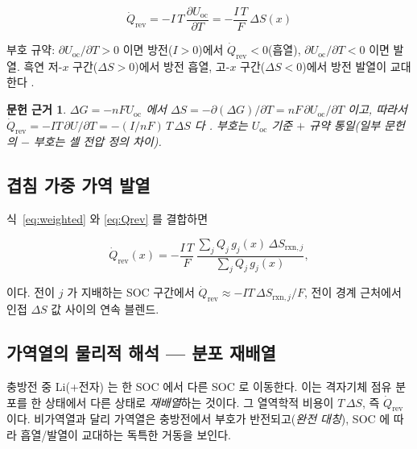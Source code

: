 \documentclass[11pt,a4paper]{article}
\newtheorem*{srcbox}{문헌 근거}
\newcommand{\rxn}{\mathrm{rxn}}
\newcommand{\rev}{\mathrm{rev}}
\newcommand{\oc}{\mathrm{oc}}
\begin{document}
\begin{equation}
  \boxed{\;
    \dot Q_\rev = -I\,T\,\frac{\partial U_\oc}{\partial T}
    = -\frac{I\,T}{F}\,\Delta S(x)
  \;}
  \label{eq:Qrev}
\end{equation}

부호 규약: $\partial U_\oc/\partial T > 0$ 이면 방전($I > 0$)에서 $\dot Q_\rev < 0$(흡열),
$\partial U_\oc/\partial T < 0$ 이면 발열. 흑연 저-$x$ 구간($\Delta S > 0$)에서 방전 흡열,
고-$x$ 구간($\Delta S < 0$)에서 방전 발열이 교대한다 \cite{standardised2024}.

\begin{srcbox}
$\Delta G = -nFU_\oc$ 에서 $\Delta S = -\partial(\Delta G)/\partial T = nF\,\partial U_\oc/\partial T$ 이고,
따라서 $\dot Q_\rev = -IT\,\partial U/\partial T = -(I/nF)\,T\,\Delta S$ 다 \cite{newman}.
부호는 $U_\oc$ 기준 $+$ 규약 통일(일부 문헌의 $-$ 부호는 셀 전압 정의 차이).
\end{srcbox}

\subsection{겹침 가중 가역 발열}

식~\eqref{eq:weighted} 와 \eqref{eq:Qrev} 를 결합하면

\begin{equation}
  \dot Q_\rev(x)
  = -\frac{I\,T}{F}\,\frac{\sum_j Q_j\,g_j(x)\,\Delta S_{\rxn,j}}{\sum_j Q_j\,g_j(x)},
  \label{eq:Qrev_sum}
\end{equation}

이다. 전이 $j$ 가 지배하는 SOC 구간에서 $\dot Q_\rev \approx -IT\,\Delta S_{\rxn,j}/F$,
전이 경계 근처에서 인접 $\Delta S$ 값 사이의 연속 블렌드.

\subsection{가역열의 물리적 해석 — 분포 재배열}

충방전 중 Li(+전자) 는 한 SOC 에서 다른 SOC 로 이동한다. 이는 격자기체 점유 분포를
한 상태에서 다른 상태로 \emph{재배열}하는 것이다. 그 열역학적 비용이 $T\,\Delta S$, 즉
$\dot Q_\rev$이다. 비가역열과 달리 가역열은 충방전에서 부호가 반전되고(\emph{완전 대칭}),
SOC 에 따라 흡열/발열이 교대하는 독특한 거동을 보인다.
\end{document}
